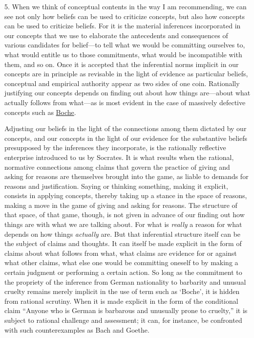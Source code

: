 5. When we think of conceptual contents in the way I am recommending, we
can see not only how beliefs can be used to criticize concepts, but also
how concepts can be used to criticize beliefs. For it is the material
inferences incorporated in our concepts that we use to elaborate the
antecedents and consequences of various candidates for belief---to tell
what we would be committing ourselves to, what would entitle us to those
commitments, what would be incompatible with them, and so on. Once it is
accepted that the inferential norms implicit in our concepts are in
principle as revisable in the light of evidence as particular beliefs,
conceptual and empirical authority appear as two sides of one coin.
Rationally justifying our concepts depends on finding out about how
things are---about what actually follows from what---as is most evident
in the case of massively defective concepts such as \underline{Boche}.

Adjusting our beliefs in the light of the connections among them
dictated by our concepts, and our concepts in the light of our evidence
for the substantive beliefs presupposed by the inferences they
incorporate, is the rationally reflective enterprise introduced to us by
Socrates. It is what results when the rational, normative connections
among claims that govern the practice of giving and asking for reasons
are themselves brought into the game, as liable to demands for reasons
and justification. Saying or thinking something, making it explicit,
consists in applying concepts, thereby taking up a stance in the space
of reasons, making a move in the game of giving and asking for reasons.
The structure of that space, of that game, though, is not given in
advance of our finding out how things are with what we are talking
about. For what is \emph{really} a reason for what depends on how things
\emph{actually} are. But that inferential structure itself can be the
subject of claims and thoughts. It can itself be made explicit in the
form of claims about what follows from what, what claims are evidence
for or against what other claims, what else one would be committing
oneself to by making a certain judgment or performing a certain action.
So long as the commitment to the propriety of the inference from German
nationality to barbarity and unusual cruelty remains merely implicit in
the use of term such as `Boche', it is hidden from rational scrutiny.
When it is made explicit in the form of the conditional claim ``Anyone
who is German is barbarous and unusually prone to cruelty,'' it is
subject to rational challenge and assessment; it can, for instance, be
confronted with such counterexamples as Bach and Goethe.

